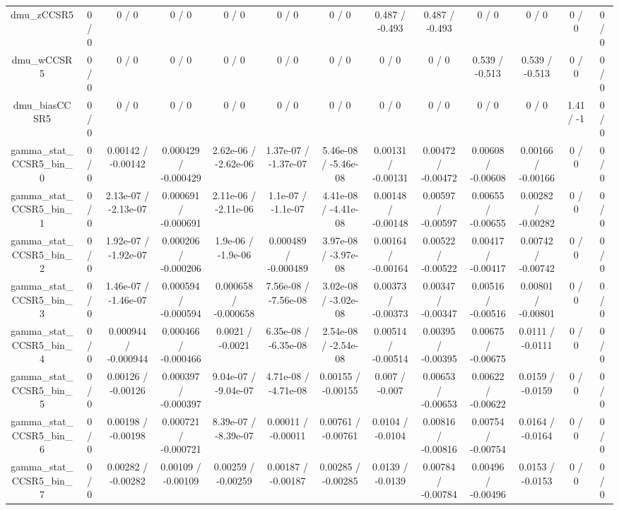 \documentclass[10pt]{article}
\begin{document}
\begin{table}[htbp]
\begin{center}
\begin{tabular}{|c|c|c|c|c|c|c|c|c|c|c|c|c|}
  dmu_zCCSR5 & 0 / 0 & 0 / 0 & 0 / 0 & 0 / 0 & 0 / 0 & 0 / 0 & 0.487 / -0.493 & 0.487 / -0.493 & 0 / 0 & 0 / 0 & 0 / 0 & 0 / 0 \\ 
  dmu_wCCSR5 & 0 / 0 & 0 / 0 & 0 / 0 & 0 / 0 & 0 / 0 & 0 / 0 & 0 / 0 & 0 / 0 & 0.539 / -0.513 & 0.539 / -0.513 & 0 / 0 & 0 / 0 \\ 
  dmu_biasCCSR5 & 0 / 0 & 0 / 0 & 0 / 0 & 0 / 0 & 0 / 0 & 0 / 0 & 0 / 0 & 0 / 0 & 0 / 0 & 0 / 0 & 1.41 / -1 & 0 / 0 \\ 
  gamma_stat_CCSR5_bin_0 & 0 / 0 & 0.00142 / -0.00142 & 0.000429 / -0.000429 & 2.62e-06 / -2.62e-06 & 1.37e-07 / -1.37e-07 & 5.46e-08 / -5.46e-08 & 0.00131 / -0.00131 & 0.00472 / -0.00472 & 0.00608 / -0.00608 & 0.00166 / -0.00166 & 0 / 0 & 0 / 0 \\ 
  gamma_stat_CCSR5_bin_1 & 0 / 0 & 2.13e-07 / -2.13e-07 & 0.000691 / -0.000691 & 2.11e-06 / -2.11e-06 & 1.1e-07 / -1.1e-07 & 4.41e-08 / -4.41e-08 & 0.00148 / -0.00148 & 0.00597 / -0.00597 & 0.00655 / -0.00655 & 0.00282 / -0.00282 & 0 / 0 & 0 / 0 \\ 
  gamma_stat_CCSR5_bin_2 & 0 / 0 & 1.92e-07 / -1.92e-07 & 0.000206 / -0.000206 & 1.9e-06 / -1.9e-06 & 0.000489 / -0.000489 & 3.97e-08 / -3.97e-08 & 0.00164 / -0.00164 & 0.00522 / -0.00522 & 0.00417 / -0.00417 & 0.00742 / -0.00742 & 0 / 0 & 0 / 0 \\ 
  gamma_stat_CCSR5_bin_3 & 0 / 0 & 1.46e-07 / -1.46e-07 & 0.000594 / -0.000594 & 0.000658 / -0.000658 & 7.56e-08 / -7.56e-08 & 3.02e-08 / -3.02e-08 & 0.00373 / -0.00373 & 0.00347 / -0.00347 & 0.00516 / -0.00516 & 0.00801 / -0.00801 & 0 / 0 & 0 / 0 \\ 
  gamma_stat_CCSR5_bin_4 & 0 / 0 & 0.000944 / -0.000944 & 0.000466 / -0.000466 & 0.0021 / -0.0021 & 6.35e-08 / -6.35e-08 & 2.54e-08 / -2.54e-08 & 0.00514 / -0.00514 & 0.00395 / -0.00395 & 0.00675 / -0.00675 & 0.0111 / -0.0111 & 0 / 0 & 0 / 0 \\ 
  gamma_stat_CCSR5_bin_5 & 0 / 0 & 0.00126 / -0.00126 & 0.000397 / -0.000397 & 9.04e-07 / -9.04e-07 & 4.71e-08 / -4.71e-08 & 0.00155 / -0.00155 & 0.007 / -0.007 & 0.00653 / -0.00653 & 0.00622 / -0.00622 & 0.0159 / -0.0159 & 0 / 0 & 0 / 0 \\ 
  gamma_stat_CCSR5_bin_6 & 0 / 0 & 0.00198 / -0.00198 & 0.000721 / -0.000721 & 8.39e-07 / -8.39e-07 & 0.00011 / -0.00011 & 0.00761 / -0.00761 & 0.0104 / -0.0104 & 0.00816 / -0.00816 & 0.00754 / -0.00754 & 0.0164 / -0.0164 & 0 / 0 & 0 / 0 \\ 
  gamma_stat_CCSR5_bin_7 & 0 / 0 & 0.00282 / -0.00282 & 0.00109 / -0.00109 & 0.00259 / -0.00259 & 0.00187 / -0.00187 & 0.00285 / -0.00285 & 0.0139 / -0.0139 & 0.00784 / -0.00784 & 0.00496 / -0.00496 & 0.0153 / -0.0153 & 0 / 0 & 0 / 0 \\ 

\end{tabular}
\end{center}
\end{table}
\end{document}
